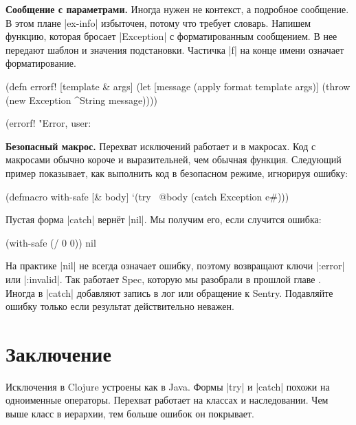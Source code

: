 \textbf{Сообщение с параметрами.} Иногда нужен не контекст, а подробное
сообщение. В этом плане \spverb|ex-info| избыточен, потому что требует
словарь. Напишем функцию, которая бросает \spverb|Exception| с форматированным
сообщением. В нее передают шаблон и значения подстановки. Частичка \spverb|f| на
конце имени означает форматирование.

\begin{english}
  \begin{clojure}
(defn errorf! [template & args]
  (let [message (apply format template args)]
    (throw (new Exception ^String message))))

(errorf! "Error, user: %
  \end{clojure}
\end{english}

\textbf{Безопасный макрос.} Перехват исключений работает и в макросах. Код с
макросами обычно короче и выразительней, чем обычная функция. Следующий пример
показывает, как выполнить код в безопасном режиме, игнорируя ошибку:

\begin{english}
  \begin{clojure}
(defmacro with-safe [& body]
  `(try
     ~@body
     (catch Exception e#)))
  \end{clojure}
\end{english}

Пустая форма \spverb|catch| верн\"{е}т \spverb|nil|. Мы получим его, если случится
ошибка:

\begin{english}
  \begin{clojure}
(with-safe (/ 0 0))
nil
  \end{clojure}
\end{english}

На практике \spverb|nil| не всегда означает ошибку, поэтому возвращают ключи
\spverb|:error| или \spverb|:invalid|. Так работает Spec, которую мы разобрали в
прошлой главе . Иногда в \spverb|catch| добавляют запись в
лог или обращение к Sentry. Подавляйте ошибку только если результат
действительно неважен.

\section{Заключение}

Исключения в Clojure устроены как в Java. Формы \spverb|try| и \spverb|catch|
похожи на одноименные операторы. Перехват работает на классах и
наследовании. Чем выше класс в иерархии, тем больше ошибок он покрывает.

